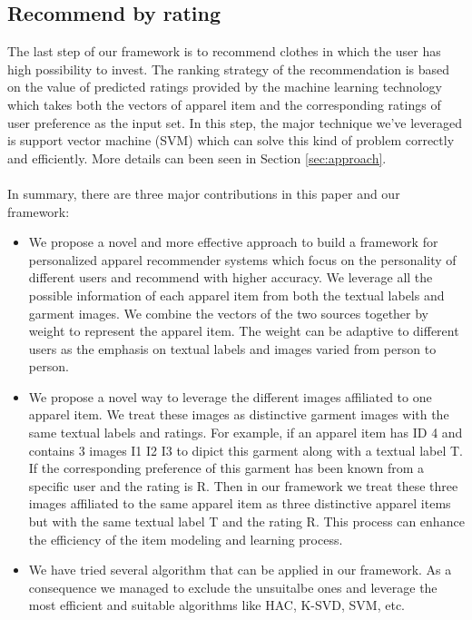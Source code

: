 \subsection{Recommend by rating}
The last step of our framework is to recommend clothes in which the user has high possibility to invest. The ranking strategy of the recommendation is based on the value of predicted ratings provided by the machine learning technology which takes both the vectors of apparel item and the corresponding ratings of user preference as the input set. In this step, the major technique we've leveraged is support vector machine (SVM) which can solve this kind of problem correctly and efficiently. More details can been seen in Section \ref{sec:approach}.\\
\\
In summary, there are three major contributions in this paper and our framework:
\begin{itemize}
	\item We propose a novel and more effective approach to build a framework for personalized apparel recommender systems which focus on the personality of different users and recommend with higher accuracy. We leverage all the possible information of each apparel item from both the textual labels and garment images. We combine the vectors of the two sources together by weight to represent the apparel item. The weight can be adaptive to different users as the emphasis on textual labels and images varied from person to person.
	\item We propose a novel way to leverage the different images affiliated to one apparel item. We treat these images as distinctive garment images with the same textual labels and ratings. For example, if an apparel item has ID 4 and contains 3 images I1 I2 I3 to dipict this garment along with a textual label T. If the corresponding preference of this garment has been known from a specific user and the rating is R. Then in our framework we treat these three images affiliated to the same
        apparel item as three distinctive apparel items but with the same textual label T and the rating R. This process can enhance the efficiency of the item modeling and learning process.
	\item We have tried several algorithm that can be applied in our framework. As a consequence we managed to exclude the unsuitalbe ones and leverage the most efficient and suitable algorithms like HAC, K-SVD, SVM, etc.
\end{itemize}
